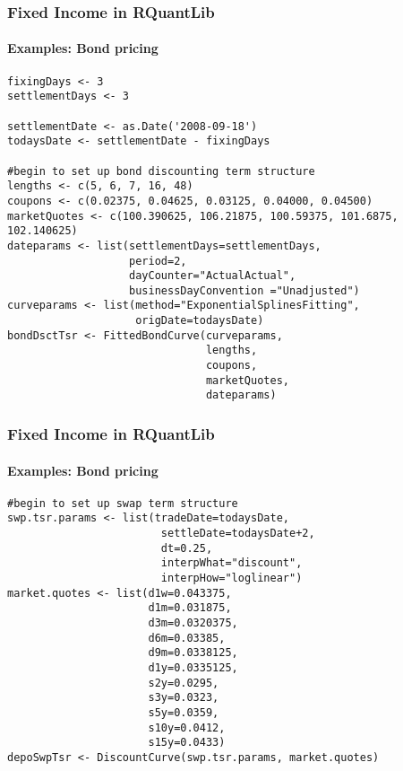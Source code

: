 \documentclass[smaller,compress]{beamer}
\begin{document}
\begin{frame}[fragile]
	\frametitle{Fixed Income in RQuantLib}
	\framesubtitle{Examples: Bond pricing}	
			\lstset{language=R,basicstyle=\tiny}
				\begin{lstlisting}
fixingDays <- 3
settlementDays <- 3

settlementDate <- as.Date('2008-09-18')
todaysDate <- settlementDate - fixingDays

#begin to set up bond discounting term structure
lengths <- c(5, 6, 7, 16, 48)
coupons <- c(0.02375, 0.04625, 0.03125, 0.04000, 0.04500)
marketQuotes <- c(100.390625, 106.21875, 100.59375, 101.6875, 102.140625)
dateparams <- list(settlementDays=settlementDays,
                   period=2, 
                   dayCounter="ActualActual", 
                   businessDayConvention ="Unadjusted")
curveparams <- list(method="ExponentialSplinesFitting", 
                    origDate=todaysDate)
bondDsctTsr <- FittedBondCurve(curveparams,
                               lengths,
                               coupons,
                               marketQuotes,
                               dateparams)
\end{lstlisting}
\end{frame}

\begin{frame}[fragile]
	\frametitle{Fixed Income in RQuantLib}
	\framesubtitle{Examples: Bond pricing}	
			\lstset{language=R,basicstyle=\tiny}
				\begin{lstlisting}
#begin to set up swap term structure
swp.tsr.params <- list(tradeDate=todaysDate,
                        settleDate=todaysDate+2,
                        dt=0.25,
                        interpWhat="discount",
                        interpHow="loglinear")
market.quotes <- list(d1w=0.043375,
                      d1m=0.031875,
                      d3m=0.0320375,
                      d6m=0.03385,
                      d9m=0.0338125,
                      d1y=0.0335125,                      
                      s2y=0.0295,
                      s3y=0.0323,
                      s5y=0.0359,
                      s10y=0.0412,
                      s15y=0.0433)
depoSwpTsr <- DiscountCurve(swp.tsr.params, market.quotes)
\end{lstlisting}
\end{frame}
\end{document}
